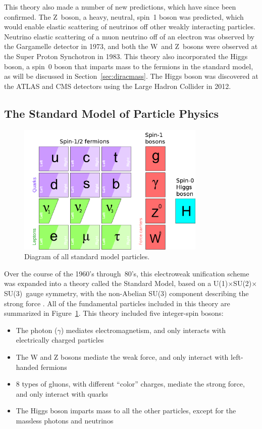 \documentclass[/main.tex]{subfiles}
\begin{document}
This theory also made a number of new predictions, which have since been confirmed.
The Z~boson, a heavy, neutral, spin~1 boson was predicted, which would enable elastic scattering of neutrinos off other weakly interacting particles.
Neutrino elastic scattering of a muon neutrino off of an electron was observed by the Gargamelle detector in 1973\cite{Gargamelle1973}, and both the W~and Z~bosons were observed at the Super Proton Synchotron in 1983\cite{Arnison1983, Bagnaia1983}.
This theory also incorporated the Higgs boson, a spin~0 boson that imparts mass to the fermions in the standard model, as will be discussed in Section~\ref{sec:diracmass}.
The Higgs boson was discovered at the ATLAS and CMS detectors using the Large Hadron Collider in 2012\cite{ATLAS2012, CMS2012}.

\subsection{The Standard Model of Particle Physics} \label{sec:SM}
\begin{figure}[t]
  \centering
  \includegraphics[width=0.8\textwidth]{SM}
  \caption[Standard Model Particles]{\label{fig:SM}
    Diagram of all standard model particles.
  }
\end{figure}
Over the course of the 1960's through~80's, this electroweak unification scheme was expanded into a theory called the Standard Model, based on a U(1)$\times$SU(2)$\times$SU(3)~gauge symmetry, with the non-Abelian SU(3) component describing the strong force \cite{PDG2018}.
All of the fundamental particles included in this theory are summarized in Figure~\ref{fig:SM}.
This theory included five integer-spin bosons:
\begin{itemize}
\item The photon ($\gamma$) mediates electromagnetism, and only interacts with electrically charged particles
\item The W and Z bosons mediate the weak force, and only interact with left-handed fermions
\item 8 types of gluons, with different ``color'' charges, mediate the strong force, and only interact with quarks
\item The Higgs boson imparts mass to all the other particles, except for the massless photons and neutrinos
\end{itemize}
\end{document}
